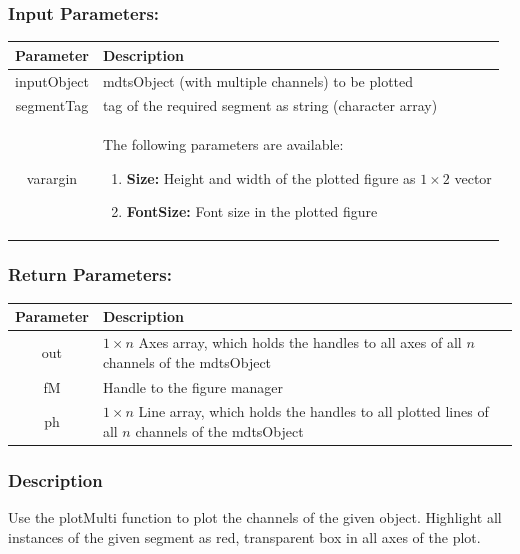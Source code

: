 \documentclass[a4]{scrreprt}
\begin{document}
\subsubsection{Input Parameters:}

\begin{longtabu} to \textwidth {|c|X|}
	\hline
	\textbf{Parameter} & \textbf{Description} \\ \hline
	\endhead
	inputObject & mdtsObject (with multiple channels) to be plotted \\ \hline
	segmentTag & tag of the required segment as string (character array) \\ \hline
	varargin & The following parameters are available:
	\begin{enumerate}
		\item \textbf{Size:} Height and width of the plotted figure as $1 \times 2$ vector
		\item \textbf{FontSize:} Font size in the plotted figure
	\end{enumerate} \\ \hline
\end{longtabu}

\subsubsection{Return Parameters:}

\begin{longtabu} to \textwidth {|c|X|}
	\hline
	\textbf{Parameter} & \textbf{Description} \\ \hline
	\endhead
	out & $1 \times n$ Axes array, which holds the handles to all axes of all $n$ channels of the mdtsObject \\ \hline
	fM & Handle to the figure manager \\ \hline
	ph & $1 \times n$ Line array, which holds the handles to all plotted lines of all $n$ channels of the mdtsObject \\ \hline
\end{longtabu}

\subsubsection{Description}

Use the plotMulti function to plot the channels of the given object. Highlight all instances of the given segment as red, transparent box in all axes of the plot.
\end{document}
